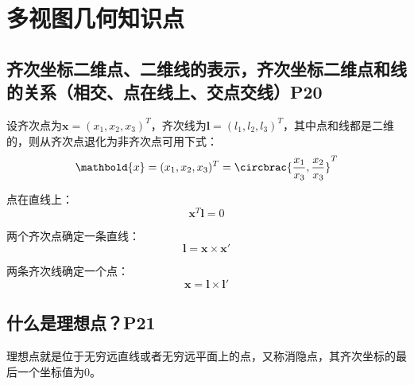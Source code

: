 \documentclass[11pt]{article}
\begin{document}

\setcounter{tocdepth}{3}
\tableofcontents
\newpage
{}
\section{多视图几何知识点}
\subsection{齐次坐标二维点、二维线的表示，齐次坐标二维点和线的关系（相交、点在线上、交点交线）P20}
设齐次点为$\mathbold{x}=(x_1,x_2,x_3)^T$，齐次线为$\mathbold{l}=(l_1,l_2,l_3)^T$，其中点和线都是二维的，则从齐次点退化为非齐次点可用下式：
\begin{equation*}
  \mathbold{x}=(x_1,x_2,x_3)^T=\circbrac{\frac{x_1}{x_3},\frac{x_2}{x_3}}^T
\end{equation*}\par
点在直线上：
\begin{equation*}
  \mathbold{x}^T\mathbold{l}=0
\end{equation*}\par
两个齐次点确定一条直线：
\begin{equation*}
  \mathbold{l}=\mathbold{x}\times\mathbold{x}'
\end{equation*}\par
两条齐次线确定一个点：
\begin{equation*}
  \mathbold{x}=\mathbold{l}\times\mathbold{l}'
\end{equation*}\par
\subsection{什么是理想点？P21}
理想点就是位于无穷远直线或者无穷远平面上的点，又称消隐点，其齐次坐标的最后一个坐标值为0。
\end{document}

